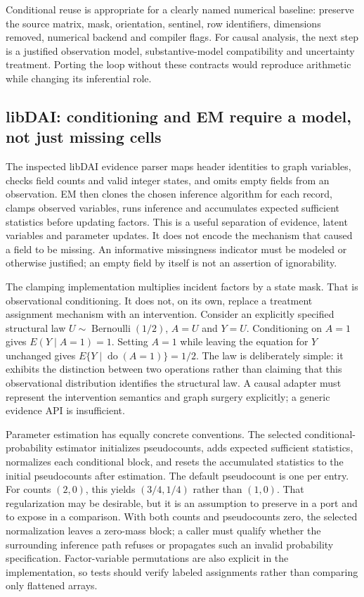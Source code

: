 Conditional reuse is appropriate for a clearly named numerical baseline: preserve the source matrix, mask, orientation, sentinel, row identifiers, dimensions removed, numerical backend and compiler flags. For causal analysis, the next step is a justified observation model, substantive-model compatibility and uncertainty treatment. Porting the loop without these contracts would reproduce arithmetic while changing its inferential role.~\citep{exec25_ctm_choice}

\subsection*{libDAI: conditioning and EM require a model, not just missing cells}
The inspected libDAI evidence parser maps header identities to graph variables, checks field counts and valid integer states, and omits empty fields from an observation. EM then clones the chosen inference algorithm for each record, clamps observed variables, runs inference and accumulates expected sufficient statistics before updating factors. This is a useful separation of evidence, latent variables and parameter updates. It does not encode the mechanism that caused a field to be missing. An informative missingness indicator must be modeled or otherwise justified; an empty field by itself is not an assertion of ignorability.~\citep{exec25_ctm_libdai}

The clamping implementation multiplies incident factors by a state mask. That is observational conditioning. It does not, on its own, replace a treatment assignment mechanism with an intervention. Consider an explicitly specified structural law $U\sim\operatorname{Bernoulli}(1/2)$, $A=U$ and $Y=U$. Conditioning on $A=1$ gives $E(Y\mid A=1)=1$. Setting $A=1$ while leaving the equation for $Y$ unchanged gives $E\{Y\mid\operatorname{do}(A=1)\}=1/2$. The law is deliberately simple: it exhibits the distinction between two operations rather than claiming that this observational distribution identifies the structural law. A causal adapter must represent the intervention semantics and graph surgery explicitly; a generic evidence API is insufficient.~\citep{exec25_ctm_libdai,exec25_ctm_choice}

Parameter estimation has equally concrete conventions. The selected conditional-probability estimator initializes pseudocounts, adds expected sufficient statistics, normalizes each conditional block, and resets the accumulated statistics to the initial pseudocounts after estimation. The default pseudocount is one per entry. For counts $(2,0)$, this yields $(3/4,1/4)$ rather than $(1,0)$. That regularization may be desirable, but it is an assumption to preserve in a port and to expose in a comparison. With both counts and pseudocounts zero, the selected normalization leaves a zero-mass block; a caller must qualify whether the surrounding inference path refuses or propagates such an invalid probability specification. Factor-variable permutations are also explicit in the implementation, so tests should verify labeled assignments rather than comparing only flattened arrays.~\citep{exec25_ctm_libdai,exec25_ctm_choice}

